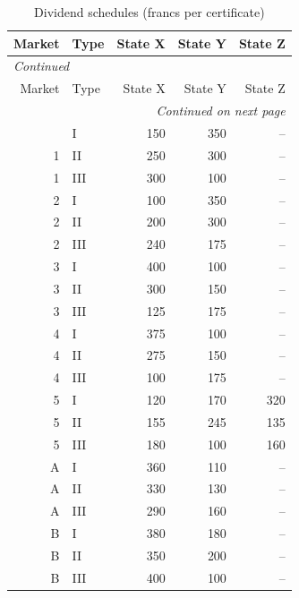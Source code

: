 \scriptsize
\begin{longtable}{rlrrr}
\caption{Dividend schedules (francs per certificate)}\label{tab:app-dividends}\\
\toprule
Market & Type & State X & State Y & State Z \\
\midrule
\endfirsthead
\multicolumn{5}{l}{\textit{Continued}}\\
\toprule
Market & Type & State X & State Y & State Z \\
\midrule
\endhead
\midrule
\multicolumn{5}{r}{\textit{Continued on next page}}\\
\endfoot
\bottomrule
\endlastfoot
1 & I & 150 & 350 & -- \\
1 & II & 250 & 300 & -- \\
1 & III & 300 & 100 & -- \\
2 & I & 100 & 350 & -- \\
2 & II & 200 & 300 & -- \\
2 & III & 240 & 175 & -- \\
3 & I & 400 & 100 & -- \\
3 & II & 300 & 150 & -- \\
3 & III & 125 & 175 & -- \\
4 & I & 375 & 100 & -- \\
4 & II & 275 & 150 & -- \\
4 & III & 100 & 175 & -- \\
5 & I & 120 & 170 & 320 \\
5 & II & 155 & 245 & 135 \\
5 & III & 180 & 100 & 160 \\
A & I & 360 & 110 & -- \\
A & II & 330 & 130 & -- \\
A & III & 290 & 160 & -- \\
B & I & 380 & 180 & -- \\
B & II & 350 & 200 & -- \\
B & III & 400 & 100 & -- \\
\end{longtable}
